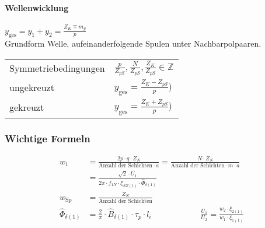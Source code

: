 \begin{sectionbox}
\paragraph{Wellenwicklung}
$y_\text{ges} = y_1 + y_2 = \frac{Z_K\mp m_g}{p}$\\
Grundform Welle, aufeinanderfolgende Spulen unter Nachbarpolpaaren.

\begin{tabularx}{\columnwidth}{XX}
Symmetriebedingungen & $\frac{p}{Z_{pS}}, \frac{N}{Z_{pS}}, \frac{Z_K}{Z_{pS}}\in\mathbb{Z}$\\
ungekreuzt & $y_\text{ges} = \frac{Z_K - Z_{pS}}{p})$\\
gekreuzt & $y_\text{ges} = \frac{Z_K + Z_{pS}}{p})$
\end{tabularx}
\end{sectionbox}

\begin{sectionbox}
\subsubsection{Wichtige Formeln}
\begin{align*}
w_1 &= \frac{2p\cdot q\cdot Z_N}{\text{Anzahl der Schichten}\cdot a} = \frac{N\cdot Z_N}{\text{Anzahl der Schichten}\cdot m\cdot a}\\
&= \frac{\sqrt{2}\cdot U_1}{2\pi\cdot f_{1N}\cdot\xi_{SZ(1)}\cdot\hat{\Phi}_{\delta(1)}}\\
w_\text{Sp} &= \frac{Z_N}{\text{Anzahl der Schichten}}\\
\hat{\Phi}_{\delta(1)} &= \frac{2}{\pi}\cdot\hat{B}_{\delta(1)}\cdot\tau_p\cdot l_i\qquad\qquad\qquad\frac{U_1}{U_2} = \frac{w_2\cdot\xi_{2(1)}}{w_1\cdot\xi_{1(1)}}
\end{align*}
\end{sectionbox}

